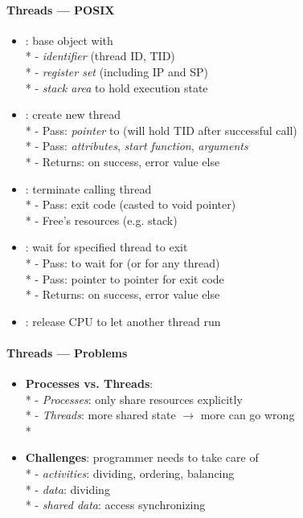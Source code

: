 \paragraph{Threads --- POSIX}
\begin{itemize}
  \item {}: base object with \\*
    - \emph{identifier} (thread ID, TID) \\*
    - \emph{register set} (including IP and SP) \\*
    - \emph{stack area} to hold execution state
  \item {}: create new thread \\*
    - Pass: \emph{pointer} to  (will hold TID after successful call) \\*
    - Pass: \emph{attributes}, \emph{start function}, \emph{arguments} \\*
    - Returns:  on success, error value else
  \item {}: terminate calling thread \\*
    - Pass: exit code (casted to void pointer) \\*
    - Free's resources (e.g. stack)
  \item {}: wait for specified thread to exit \\*
    - Pass:  to wait for (or  for any thread) \\*
    - Pass: pointer to pointer for exit code \\*
    - Returns:  on success, error value else
  \item {}: release CPU to let another thread run
\end{itemize}

\paragraph{Threads --- Problems}
\begin{itemize}
  \item \textbf{Processes vs. Threads}: \\*
    - \emph{Processes}: only share resources explicitly \\*
    - \emph{Threads}: more shared state \( \to \) more can go wrong \\*
  \item \textbf{Challenges}: programmer needs to take care of \\*
    - \emph{activities}: dividing, ordering, balancing \\*
    - \emph{data}: dividing \\*
    - \emph{shared data}: access synchronizing
\end{itemize}

